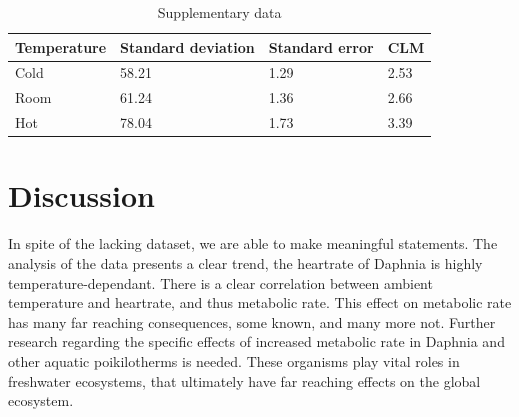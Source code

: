 \documentclass[a4paper, british]{article}
\begin{document}
\begin{table}[htb]
    \centering
    \begin{tabular}[]{llll}
        \addlinespace
        \toprule
        Temperature& Standard deviation & Standard error & CLM\\
        \midrule
        Cold &58.21&1.29& 2.53\\
        Room&61.24&1.36& 2.66\\
        Hot &78.04&1.73&3.39\\
        \bottomrule
    \end{tabular}
    \caption{Supplementary data}
    \label{table:1}
\end{table}


\section{Discussion}

In spite of the lacking dataset, we are able to make meaningful statements. The analysis of the data presents a clear trend, the heartrate of Daphnia is highly temperature-dependant.
There is a clear correlation between ambient temperature and heartrate, and thus metabolic rate. This effect on metabolic rate has many far reaching consequences, some known, and many more not. Further research regarding the specific effects of increased metabolic rate in Daphnia and other aquatic poikilotherms is needed. These organisms play vital roles in freshwater ecosystems, that ultimately have far reaching  effects on the global ecosystem.
\printbibliography
\end{document}
